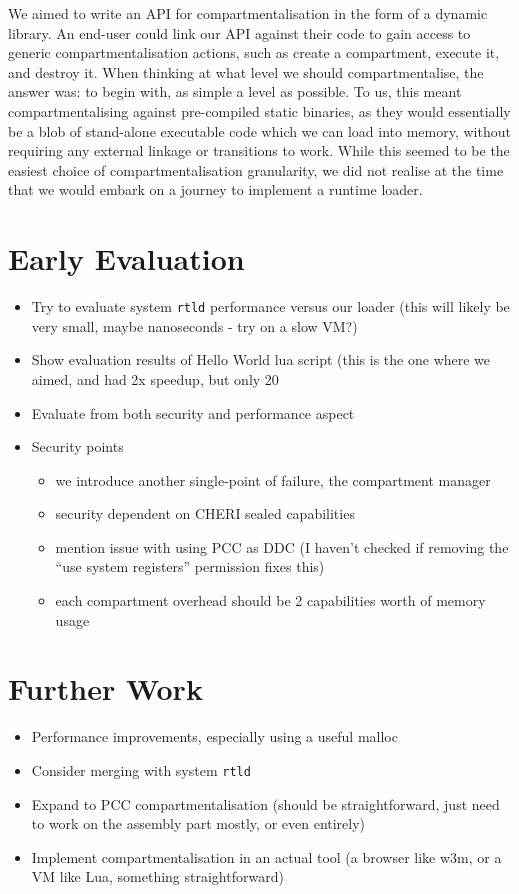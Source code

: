 We aimed to write an API for compartmentalisation in the form of a dynamic
library. An end-user could link our API against their code to gain access to
generic compartmentalisation actions, such as create a compartment, execute it,
and destroy it. When thinking at what level we should compartmentalise, the
answer was: to begin with, as simple a level as possible. To us, this meant
compartmentalising against pre-compiled static binaries, as they would
essentially be a blob of stand-alone executable code which we can load into
memory, without requiring any external linkage or transitions to work. While
this seemed to be the easiest choice of compartmentalisation granularity, we
did not realise at the time that we would embark on a journey to implement a
runtime loader.


\section{Early Evaluation}
\begin{itemize}
    \item Try to evaluate system \texttt{rtld} performance versus our loader (this will likely be very small, maybe nanoseconds - try on a slow VM?)
    \item Show evaluation results of Hello World lua script (this is the one where we aimed, and had 2x speedup, but only 20%
    \item Evaluate from both security and performance aspect
    \item Security points
    \begin{itemize}
        \item we introduce another single-point of failure, the compartment manager
        \item security dependent on CHERI sealed capabilities
        \item mention issue with using PCC as DDC (I haven't checked if removing the ``use system registers'' permission fixes this)
        \item each compartment overhead should be 2 capabilities worth of memory usage
    \end{itemize}
\end{itemize}

\section{Further Work}
\begin{itemize}
    \item Performance improvements, especially using a useful malloc
    \item Consider merging with system \texttt{rtld}
    \item Expand to PCC compartmentalisation (should be straightforward, just need to work on the assembly part mostly, or even entirely)
    \item Implement compartmentalisation in an actual tool (a browser like w3m, or a VM like Lua, something straightforward)
\end{itemize}

